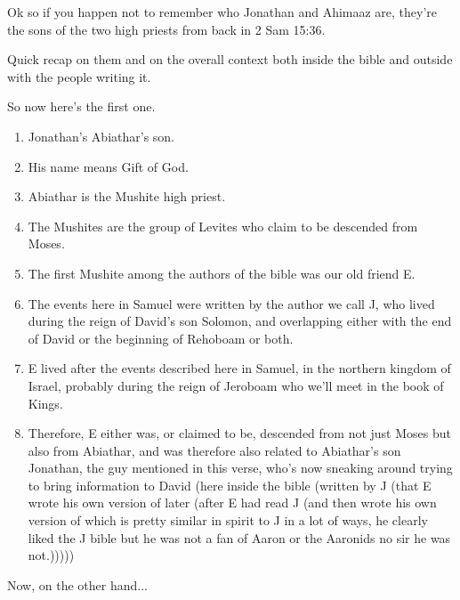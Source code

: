 {
	Ok so if you happen not to remember who Jonathan and
	Ahimaaz are, they're the sons of the two high priests from back in 2 Sam
	15:36.

	Quick recap on them and on the overall context both inside the bible and
	outside with the people writing it.

	So now here's the first one.

	\begin{enumerate}
	\item Jonathan's Abiathar's son.
	\item His name means Gift of God.
	\item Abiathar is the Mushite high priest.
	\item The Mushites are the group of Levites who claim to be descended from
	Moses.
	\item The first Mushite among the authors of the bible was our old friend E.
	\item The events here in Samuel were written by the author we call J, who
	lived during the reign of David's son Solomon, and overlapping either with
	the end of David or the beginning of Rehoboam or both.
	\item E lived after the events described here in Samuel, in the northern
	kingdom of Israel, probably during the reign of Jeroboam who we'll meet in
	the book of Kings.
	\item Therefore, E either was, or claimed to be, descended from not just
	Moses but also from Abiathar, and was therefore also related to Abiathar's
	son Jonathan, the guy mentioned in this verse, who's now sneaking around
	trying to bring information to David (here inside the bible (written by J
	(that E wrote his own version of later (after E had read J (and then wrote
	his own version of which is pretty similar in spirit to J in a lot of ways,
	he clearly liked the J bible but he was not a fan of Aaron or the Aaronids
	no sir he was not.)))))
	\end{enumerate}

	Now, on the other hand...

}
